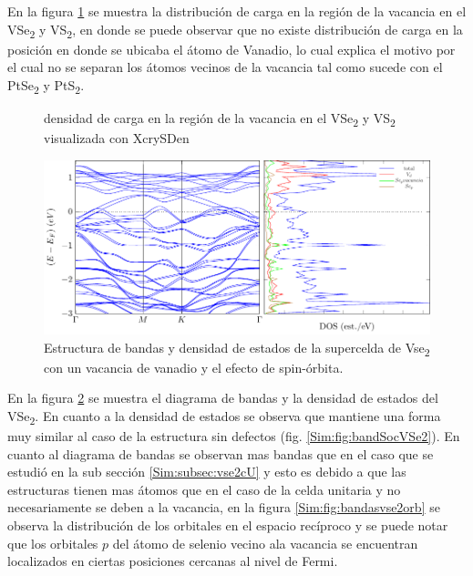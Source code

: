 En la figura \ref{Sim:fig:cargavacV} se muestra la distribuci\'on de carga en la regi\'on de la vacancia en el VSe\textsubscript{2} y VS\textsubscript{2}, en donde se puede observar que no existe distribuci\'on de carga en la posici\'on en donde se ubicaba el \'atomo de Vanadio, lo cual explica el motivo por el cual no se separan los \'atomos  vecinos de la vacancia tal como sucede con el PtSe\textsubscript{2} y PtS\textsubscript{2}.
\newline
\begin{figure}[!hbt]
	\centering
\caption[Densidad de carga en el VSe\textsubscript{2} yVS\textsubscript{2}]{densidad de carga en la regi\'on de la vacancia en el VSe\textsubscript{2} y VS\textsubscript{2} visualizada con XcrySDen }
\label{Sim:fig:cargavacV}	
\end{figure}
\begin{figure}[!hbt]
	\centering
	\includegraphics[scale=1]{figRes/VSe2/def/bandas/soc/bandasDOS.pdf}
	\caption[Diagrama de bandas y densidad de estados con el efecto spin-\'orbita del VSe\textsubscript{2} con vacancia de Vanadio.]{Estructura de bandas y densidad de estados de la supercelda de Vse\textsubscript{2} con un vacancia de vanadio y el efecto de spin-\'orbita.}
	\label{Sim:fig:vacVvse2band}
\end{figure}
\par En la figura \ref{Sim:fig:vacVvse2band} se muestra el diagrama de bandas y la densidad de estados  del  VSe\textsubscript{2}. En cuanto a la densidad de estados se observa que mantiene  una forma muy similar al caso de la estructura sin defectos (fig. \ref{Sim:fig:bandSocVSe2}). En cuanto al diagrama de bandas  se observan mas bandas que en el caso que se estudi\'o en la sub secci\'on \ref{Sim:subsec:vse2cU} y esto es debido a que las estructuras tienen mas \'atomos que en el caso de la celda unitaria y no necesariamente se deben a la vacancia, en la figura \ref{Sim:fig:bandasvse2orb} se observa la distribuci\'on de los orbitales en el espacio rec\'iproco y se puede notar que los orbitales $p$ del \'atomo de selenio vecino ala vacancia se encuentran localizados en ciertas posiciones cercanas al nivel de Fermi. 
